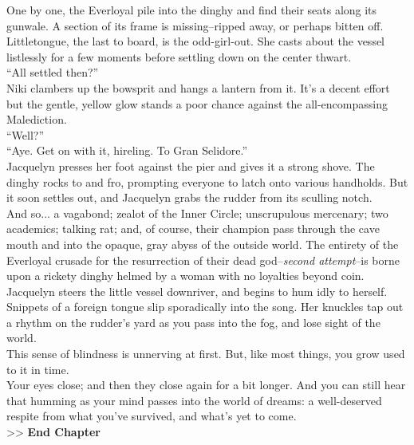 One by one, the Everloyal pile into the dinghy and find their seats along its gunwale. A section of its frame is missing--ripped away, or perhaps bitten off. Littletongue, the last to board, is the odd-girl-out. She casts about the vessel listlessly for a few moments before settling down on the center thwart.\\

“All settled then?”\\

Niki clambers up the bowsprit and hangs a lantern from it. It’s a decent effort but the gentle, yellow glow stands a poor chance against the all-encompassing Malediction.\\

“Well?”\\

“Aye. Get on with it, hireling. To Gran Selidore.”\\

Jacquelyn presses her foot against the pier and gives it a strong shove. The dinghy rocks to and fro, prompting everyone to latch onto various handholds. But it soon settles out, and Jacquelyn grabs the rudder from its sculling notch.\\

And so... a vagabond; zealot of the Inner Circle; unscrupulous mercenary; two academics; talking rat; and, of course, their champion pass through the cave mouth and into the opaque, gray abyss of the outside world. The entirety of the Everloyal crusade for the resurrection of their dead god--\emph{second attempt}--is borne upon a rickety dinghy helmed by a woman with no loyalties beyond coin.\\

Jacquelyn steers the little vessel downriver, and begins to hum idly to herself. Snippets of a foreign tongue slip sporadically into the song. Her knuckles tap out a rhythm on the rudder’s yard as you pass into the fog, and lose sight of the world.\\

This sense of blindness is unnerving at first. But, like most things, you grow used to it in time.\\

Your eyes close; and then they close again for a bit longer. And you can still hear that humming as your mind passes into the world of dreams: a well-deserved respite from what you’ve survived, and what’s yet to come.\\

>> \textbf{End Chapter}